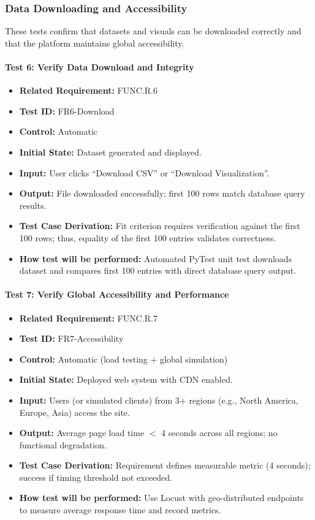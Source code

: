 \documentclass[12pt, titlepage]{article}
\begin{document}
\subsubsection{Data Downloading and Accessibility}

These tests confirm that datasets and visuals can be downloaded correctly and that the platform maintains global accessibility.

\paragraph{Test 6: Verify Data Download and Integrity}
\begin{itemize}
    \item \textbf{Related Requirement:} FUNC.R.6
    \item \textbf{Test ID:} FR6-Download
    \item \textbf{Control:} Automatic
    \item \textbf{Initial State:} Dataset generated and displayed.
    \item \textbf{Input:} User clicks ``Download CSV'' or ``Download Visualization''.
    \item \textbf{Output:} File downloaded successfully; first 100 rows match database query results.
    \item \textbf{Test Case Derivation:} Fit criterion requires verification against the first 100 rows; thus, equality of the first 100 entries validates correctness.
    \item \textbf{How test will be performed:} Automated PyTest unit test downloads dataset and compares first 100 entries with direct database query output.
\end{itemize}

\paragraph{Test 7: Verify Global Accessibility and Performance}
\begin{itemize}
    \item \textbf{Related Requirement:} FUNC.R.7
    \item \textbf{Test ID:} FR7-Accessibility
    \item \textbf{Control:} Automatic (load testing + global simulation)
    \item \textbf{Initial State:} Deployed web system with CDN enabled.
    \item \textbf{Input:} Users (or simulated clients) from 3+ regions (e.g., North America, Europe, Asia) access the site.
    \item \textbf{Output:} Average page load time $<$ 4 seconds across all regions; no functional degradation.
    \item \textbf{Test Case Derivation:} Requirement defines measurable metric (4 seconds); success if timing threshold not exceeded.
    \item \textbf{How test will be performed:} Use Locust with geo-distributed endpoints to measure average response time and record metrics.
\end{itemize}
\end{document}
